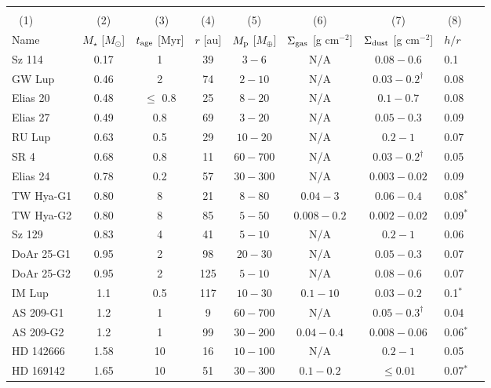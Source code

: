 \documentclass[fleqn,usenatbib]{mnras}
\newcommand{\Mearth}{M_{\oplus}}
\newcommand{\Sigg}{\Sigma_{\rm gas}}
\begin{document}
\begin{table*}
\centering
\begin{tabular}{|l|c|c|c|c|c|c|l|l|}
\hline
\\[-2mm]
\,\,\,\,(1) & (2) & \,\,(3) & (4) & (5) & (6) & (7) & \,\,(8) \\
 Name &  $M_\star$ [$M_{\odot}$]  &   $t_{\rm age}$ [Myr] & $r$ [au] & $M_{\rm p}$ [$\Mearth$] & $\Sigg$ [g cm$^{-2}$] & $\Sigma_{\rm dust}$ [g cm$^{-2}$]  & $h/r$ & 
 \\ \hline
 Sz 114 & 0.17 & 1 & 39 & $3-6$ &  N/A   & $0.08 - 0.6$ &  0.1 &  \\ 
 GW Lup & 0.46 & 2 & 74 & $2-10$ &  N/A   & $0.03 - 0.2^{\dagger}$ &  0.08  &  \\ 
 Elias 20 & 0.48 & $\leq$ 0.8 & 25 & $8-20$ &  N/A   & $0.1 - 0.7$ &  0.08 &  \\ 
 Elias 27 & 0.49 & 0.8 & 69 & $3-20$ &  N/A   & $0.05 - 0.3$ &  0.09  &  \\ 
 RU Lup & 0.63 & 0.5 & 29 & $10-20$ &  N/A   & $0.2 - 1$ &  0.07 &  \\ 
 SR 4 & 0.68 & 0.8 & 11 & $60-700$ &  N/A   & $0.03 - 0.2^{\dagger}$ &  0.05 &  \\ 
 Elias 24 & 0.78 & 0.2 & 57 & $30-300$ &  N/A   & $0.003 - 0.02$ &  0.09  &  \\ 
TW Hya-G1 & 0.80 & 8 & 21 & $8-80$ &  $0.04-3$   & $0.06 - 0.4$ &  0.08$^{\ast}$  & \\ 
TW Hya-G2 & 0.80 & 8 & 85 & $5-50$ &  $0.008-0.2$   & $0.002 - 0.02$ &  0.09$^{\ast}$  & \\ 
Sz 129 & 0.83 & 4 & 41 & $5-10$ &  N/A   & $0.2 - 1$ &  0.06 &  \\  
DoAr 25-G1 & 0.95 & 2 & 98 & $20-30$ &  N/A   & $0.05 - 0.3$ &  0.07 &  \\ 
DoAr 25-G2 & 0.95 & 2 & 125 & $5-10$ &  N/A   & $0.08 - 0.6$ &  0.07 &  \\ 
IM Lup & %
1.1 & 0.5 & 117 & $10-30$ &  $0.1-10$   & $0.03 - 0.2$ &  0.1$^{\ast}$ &  \\ 
AS 209-G1 & 1.2%
& 1 & 9 & $60-700$ &  N/A    &  $0.05-0.3^{\dagger}$ &  0.04  &  \\ 
AS 209-G2 & %
1.2 & 1 & 99 & $30-200$ &  $0.04-0.4$    &  $0.008 - 0.06$ &  0.06$^{\ast}$  &  \\
HD 142666 & 1.58 & 10 & 16 & $10-100$ &  N/A   & $0.2 - 1$ &  0.05  &  \\ 
HD 169142 & 1.65 & 10 & 51 & $30-300$ & $0.1-0.2$   & $\leq 0.01$ &  0.07$^{\ast}$ &  \\ 

\end{tabular}
\end{table*}
\end{document}
